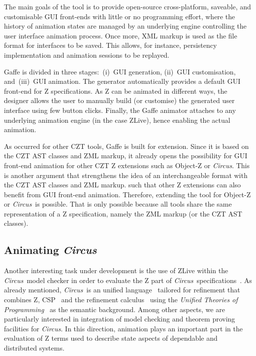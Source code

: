 \documentclass{llncs}
\newcommand{\Circus}{{\sf\slshape Circus}}
\begin{document}
    The main goals of the tool is to provide open-source cross-platform, saveable, and
    customisable GUI front-ends with little or no programming effort, where the
    history of animation states are managed by an underlying engine controlling the
    user interface animation process.
    Once more, XML markup is used as the file format for interfaces to be saved.
    This allows, for instance, persistency implementation and animation sessions
    to be replayed.

    Gaffe is divided in three stages:~(i)~GUI generation, (ii)~GUI customisation,
    and~(iii)~GUI animation. The generator automatically provides a default GUI front-end
    for Z specifications. As Z can be animated in different ways, the designer allows the
    user to manually build (or customise) the generated user interface using few button clicks.
    Finally, the Gaffe animator attaches to any underlying animation engine (in the case ZLive),
    hence enabling the actual animation.

    As occurred for other CZT tools, Gaffe is built for extension.
    Since it is based on the CZT AST classes and ZML markup, it already opens the possibility
    for GUI front-end animation for other CZT Z extensions such as Object-Z or \Circus.
    This is another argument that strengthens the idea of an interchangeable format with
    the CZT AST classes and ZML markup.
     such that other Z extensions
    can also benefit from GUI front-end animation. Therefore, extending the tool for Object-Z
    or \Circus\ is possible. That is only possible because all tools share the same
    representation of a Z specification, namely the ZML markup (or the CZT AST classes).

\subsection{Animating \Circus}

    Another interesting task under development is the use of ZLive within the \Circus\ model checker
    in order to evaluate the Z part of \Circus\ specifications~\cite{circus.mc:leo}.
    As already mentioned, \Circus\ is an unified language~\cite{circus.sem:intro} tailored for refinement
    that combines Z, CSP~\cite{csp.books:roscoe} and the refinement calculus~\cite{fm.ref:morgan}
    using the \textit{Unified Theories of Programming}~\cite{hoare.utp} as the semantic background.
    Among other aspects, we are particularly interested in integration of model checking and
    theorem proving facilities for \Circus. In this direction, animation plays an important part
    in the evaluation of Z terms used to describe state aspects of dependable and distributed systems.
\end{document}
